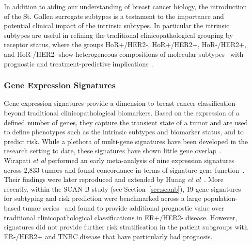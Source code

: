 \documentclass[11pt]{book}
\newcommand{\scanb}{\mbox{SCAN-B}}
\begin{document}
In addition to aiding our understanding of breast cancer biology, the introduction of the St. Gallen surrogate subtypes is a testament to the importance and potential clinical impact of the intrinsic subtypes. In particular the intrinsic subtypes are useful in refining the traditional clinicopathological grouping by receptor status, where the groups \mbox{HoR+/HER2-,} HoR+/HER2+, HoR-/HER2+, and HoR-/HER2- show heterogeneous compositions of molecular subtypes~\cite{Parker:2009} with prognostic and treatment-predictive implications~\cite{Rouzier:2005, Rody:2007, Prat:2015-subtyping, Prat:2015, Cejalvo:2018}.


\subsubsection{Gene Expression Signatures}
\label{subsec:signatures}

Gene expression signatures provide a dimension to breast cancer classification beyond traditional clinicopathological biomarkers. Based on the expression of a defined number of genes, they capture the transient state of a tumor and are used to define phenotypes such as the intrinsic subtypes and biomarker status, and to predict risk. While a plethora of multi-gene signatures have been developed in the research setting to date, these signatures have shown little gene overlap~\cite{Fan:2006}. Wirapati \textit{et al} performed an early meta-analysis of nine expression signatures across 2,833 tumors and found concordance in terms of signature gene function~\cite{Wirapati:2008}. Their findings were later reproduced and extended by Huang \textit{et al}~\cite{Huang:2018}. More recently, within the \scanb{} study (see Section~\ref{sec:scanb}), 19 gene signatures for subtyping and risk prediction were benchmarked across a large population-based tumor series~\cite{Vallon-Christersson:2019} and found to provide additional prognostic value over traditional clinicopathological classifications in ER+/HER2- disease. However, signatures did not provide further risk stratification in the patient subgroups with ER-/HER2+ and TNBC disease that have particularly bad prognosis. 
\end{document}
